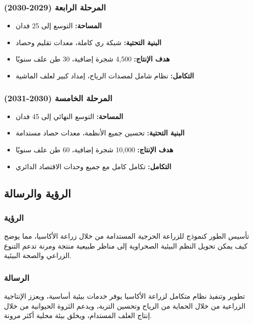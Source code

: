 \subsubsection{المرحلة الرابعة (2029-2030)}
\begin{itemize}
    \item \textbf{المساحة:} التوسع إلى 25 فدان
    \item \textbf{البنية التحتية:} شبكة ري كاملة، معدات تقليم وحصاد
    \item \textbf{هدف الإنتاج:} 4,500 شجرة إضافية، 30 طن علف سنويًا
    \item \textbf{التكامل:} نظام شامل لمصدات الرياح، إمداد كبير لعلف الماشية
\end{itemize}

\subsubsection{المرحلة الخامسة (2030-2031)}
\begin{itemize}
    \item \textbf{المساحة:} التوسع النهائي إلى 45 فدان
    \item \textbf{البنية التحتية:} تحسين جميع الأنظمة، معدات حصاد مستدامة
    \item \textbf{هدف الإنتاج:} 10,000 شجرة إضافية، 60 طن علف سنويًا
    \item \textbf{التكامل:} تكامل كامل مع جميع وحدات الاقتصاد الدائري
\end{itemize}

\subsection{الرؤية والرسالة}

\subsubsection{الرؤية}
تأسيس الطور كنموذج للزراعة الحرجية المستدامة من خلال زراعة الأكاسيا، مما يوضح كيف يمكن تحويل النظم البيئية الصحراوية إلى مناظر طبيعية منتجة ومرنة تدعم التنوع الزراعي والصحة البيئية.

\subsubsection{الرسالة}
تطوير وتنفيذ نظام متكامل لزراعة الأكاسيا يوفر خدمات بيئية أساسية، ويعزز الإنتاجية الزراعية من خلال الحماية من الرياح وتحسين التربة، ويدعم الثروة الحيوانية من خلال إنتاج العلف المستدام، ويخلق بيئة محلية أكثر مرونة.

